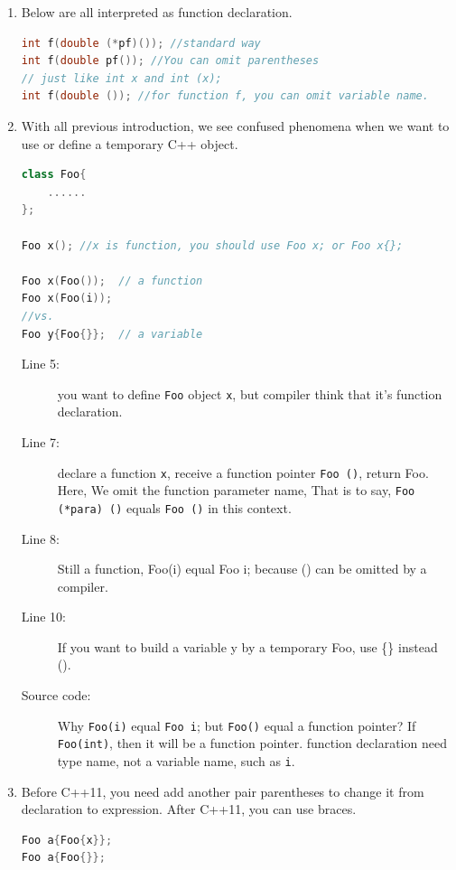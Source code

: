 \documentclass[a4paper,11pt,twoside]{book}
\begin{document}
\begin{enumerate}
	\item Below are all interpreted as function declaration.
\begin{lstlisting}[frame=single, language=c++, mathescape=true]
int f(double (*pf)()); //standard way
int f(double pf()); //You can omit parentheses
// just like int x and int (x);
int f(double ()); //for function f, you can omit variable name.
\end{lstlisting}

	\item With all previous introduction, we see confused phenomena when we want to use or define a temporary C++ object. 
\begin{lstlisting}[frame=single, language=c++]
class Foo{
	......
};
	
Foo x(); //x is function, you should use Foo x; or Foo x{};
	
Foo x(Foo());  // a function
Foo x(Foo(i)); 
//vs.
Foo y{Foo{}};  // a variable
\end{lstlisting}
\begin{description}
	\item[Line 5:] you want to define \texttt{Foo} object \texttt{x}, but compiler think that it's function declaration. 
	\item[Line 7:] declare a function \texttt{x}, receive a function pointer \texttt{Foo ()}, return Foo. Here, We omit the function parameter name, That is to say,  \texttt{Foo (*para) ()}  equals \texttt{Foo  ()} in this context.
	\item[Line 8:] Still a function, Foo(i) equal Foo i; because () can be omitted by a compiler. 
	\item[Line 10:] If you want to build a variable y by a temporary Foo, use \{\} instead ().
	\item[Source code:]  Why \texttt{Foo(i)} equal \texttt{Foo i}; but \texttt{Foo()} equal a function pointer? If \texttt{Foo(int)}, then it will be a function pointer.  function declaration need type name, not a variable name, such as \texttt{i}.	
\end{description}




	\item Before C++11, you need add another pair parentheses to change it from declaration to expression. After C++11, you can use braces.
\begin{lstlisting}[frame=single, language=c++, mathescape=true]
Foo a{Foo{x}}; 
Foo a{Foo{}};
\end{lstlisting} 


\end{enumerate}
\end{document}
